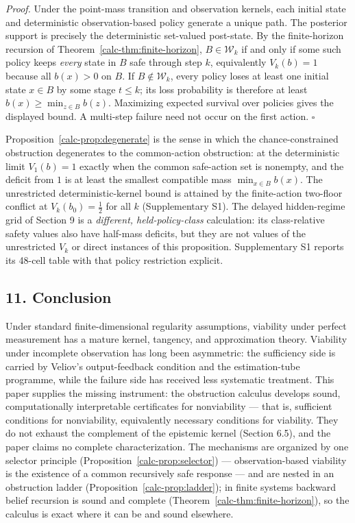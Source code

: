 \documentclass[10pt,twocolumn]{article}
\theoremstyle{definition}
\begin{document}
\emph{Proof.} Under the point-mass transition and observation kernels,
each initial state and deterministic observation-based policy generate a
unique path. The posterior support is precisely the deterministic
set-valued post-state. By the finite-horizon recursion of
Theorem~\ref{calc-thm:finite-horizon}, \(B\in\mathcal W_k\) if and only if
some such policy keeps \emph{every} state in \(B\) safe through step
\(k\), equivalently \(V_k(b)=1\) because all \(b(x)>0\) on \(B\).
If \(B\notin\mathcal W_k\), every policy loses at least one initial
state \(x\in B\) by some stage \(t\le k\); its loss probability is
therefore at least \(b(x)\ge\min_{z\in B}b(z)\). Maximizing expected
survival over policies gives the displayed bound. A multi-step failure
need not occur on the first action. \hfill\(\square\)

Proposition~\ref{calc-prop:degenerate} is the sense in which the chance-constrained obstruction degenerates to the common-action obstruction: at the deterministic limit \(V_{1}(b) = 1\) exactly when the common safe-action set is nonempty, and the deficit from \(1\) is at least the smallest compatible mass \(\min_{x \in B} b(x)\). The unrestricted deterministic-kernel bound is attained by the finite-action two-floor conflict at \(V_k(b_0)=\tfrac12\) for all \(k\) (Supplementary S1). The delayed hidden-regime grid of Section 9 is a \emph{different, held-policy-class} calculation: its class-relative safety values also have half-mass deficits, but they are not values of the unrestricted \(V_k\) or direct instances of this proposition. Supplementary S1 reports its 48-cell table with that policy restriction explicit.

\subsection{11. Conclusion}\label{calc-conclusion}

Under standard finite-dimensional regularity assumptions, viability under perfect measurement has a mature kernel, tangency, and approximation theory. Viability under incomplete observation has
long been asymmetric: the sufficiency side is carried by Veliov's
output-feedback condition and the estimation-tube programme, while the failure side has received less systematic treatment. This paper supplies the missing instrument: the obstruction calculus develops sound, computationally interpretable certificates for nonviability --- that is, sufficient conditions for nonviability, equivalently necessary conditions for viability. They do not exhaust the complement of the epistemic kernel (Section 6.5), and the paper claims no complete characterization. The mechanisms
are organized by one selector principle (Proposition~\ref{calc-prop:selector}) --- observation-based viability
is the existence of a common recursively safe response --- and are
nested in an obstruction ladder (Proposition~\ref{calc-prop:ladder}); in
finite systems backward belief recursion is sound and complete
(Theorem~\ref{calc-thm:finite-horizon}), so the calculus is exact where it
can be and sound elsewhere.
\end{document}
